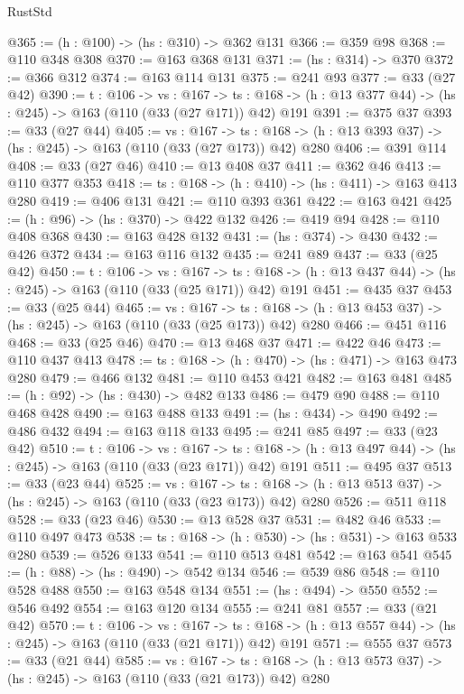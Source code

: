 \begin{lexlean}{RustStd}
\begin{coremodule}
@365 := (h : @100) -> (hs : @310) -> @362 @131
@366 := @359 @98
@368 := @110 @348 @308
@370 := @163 @368 @131
@371 := (hs : @314) -> @370
@372 := @366 @312
@374 := @163 @114 @131
@375 := @241 @93
@377 := @33 (@27 @42)
@390 := {t : @106} ->
  {vs : @167} ->
  {ts : @168} -> (h : @13 @377 @44) -> (hs : @245) -> @163 (@110 (@33 (@27 @171)) @42) @191
@391 := @375 @37
@393 := @33 (@27 @44)
@405 := {vs : @167} ->
  {ts : @168} -> (h : @13 @393 @37) -> (hs : @245) -> @163 (@110 (@33 (@27 @173)) @42) @280
@406 := @391 @114
@408 := @33 (@27 @46)
@410 := @13 @408 @37
@411 := @362 @46
@413 := @110 @377 @353
@418 := {ts : @168} -> (h : @410) -> (hs : @411) -> @163 @413 @280
@419 := @406 @131
@421 := @110 @393 @361
@422 := @163 @421
@425 := (h : @96) -> (hs : @370) -> @422 @132
@426 := @419 @94
@428 := @110 @408 @368
@430 := @163 @428 @132
@431 := (hs : @374) -> @430
@432 := @426 @372
@434 := @163 @116 @132
@435 := @241 @89
@437 := @33 (@25 @42)
@450 := {t : @106} ->
  {vs : @167} ->
  {ts : @168} -> (h : @13 @437 @44) -> (hs : @245) -> @163 (@110 (@33 (@25 @171)) @42) @191
@451 := @435 @37
@453 := @33 (@25 @44)
@465 := {vs : @167} ->
  {ts : @168} -> (h : @13 @453 @37) -> (hs : @245) -> @163 (@110 (@33 (@25 @173)) @42) @280
@466 := @451 @116
@468 := @33 (@25 @46)
@470 := @13 @468 @37
@471 := @422 @46
@473 := @110 @437 @413
@478 := {ts : @168} -> (h : @470) -> (hs : @471) -> @163 @473 @280
@479 := @466 @132
@481 := @110 @453 @421
@482 := @163 @481
@485 := (h : @92) -> (hs : @430) -> @482 @133
@486 := @479 @90
@488 := @110 @468 @428
@490 := @163 @488 @133
@491 := (hs : @434) -> @490
@492 := @486 @432
@494 := @163 @118 @133
@495 := @241 @85
@497 := @33 (@23 @42)
@510 := {t : @106} ->
  {vs : @167} ->
  {ts : @168} -> (h : @13 @497 @44) -> (hs : @245) -> @163 (@110 (@33 (@23 @171)) @42) @191
@511 := @495 @37
@513 := @33 (@23 @44)
@525 := {vs : @167} ->
  {ts : @168} -> (h : @13 @513 @37) -> (hs : @245) -> @163 (@110 (@33 (@23 @173)) @42) @280
@526 := @511 @118
@528 := @33 (@23 @46)
@530 := @13 @528 @37
@531 := @482 @46
@533 := @110 @497 @473
@538 := {ts : @168} -> (h : @530) -> (hs : @531) -> @163 @533 @280
@539 := @526 @133
@541 := @110 @513 @481
@542 := @163 @541
@545 := (h : @88) -> (hs : @490) -> @542 @134
@546 := @539 @86
@548 := @110 @528 @488
@550 := @163 @548 @134
@551 := (hs : @494) -> @550
@552 := @546 @492
@554 := @163 @120 @134
@555 := @241 @81
@557 := @33 (@21 @42)
@570 := {t : @106} ->
  {vs : @167} ->
  {ts : @168} -> (h : @13 @557 @44) -> (hs : @245) -> @163 (@110 (@33 (@21 @171)) @42) @191
@571 := @555 @37
@573 := @33 (@21 @44)
@585 := {vs : @167} ->
  {ts : @168} -> (h : @13 @573 @37) -> (hs : @245) -> @163 (@110 (@33 (@21 @173)) @42) @280

\end{coremodule}
\end{lexlean}
